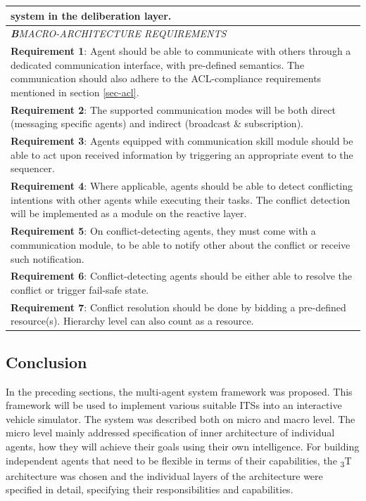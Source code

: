\documentclass[main.tex]{subfiles}
\begin{document}
\begin{table}[htbp]
\begin{tabular}{>{\footnotesize}p{}}
system in the deliberation layer.
\\ \midrule
\emph{\textbf{B}\quad MACRO-ARCHITECTURE REQUIREMENTS} \\ \midrule
\textbf{Requirement 1}: Agent should be able to communicate with others through a dedicated communication 
interface, with pre-defined semantics. The communication should also adhere to the ACL-compliance requirements 
mentioned in section \ref{sec-acl}.
\\ \midrule
\textbf{Requirement 2}: The supported communication modes will be both direct (messaging specific agents) and indirect  
(broadcast \& subscription). 
\\ \midrule
\textbf{Requirement 3}: Agents equipped with communication skill module should be able to act upon received information
by triggering an appropriate event to the sequencer. 
\\ \midrule
\textbf{Requirement 4}: Where applicable, agents should be able to detect conflicting intentions with other agents
while executing their tasks. The conflict detection will be implemented as a module on the reactive layer.
\\ \midrule
\textbf{Requirement 5}: On conflict-detecting agents, they must come with a communication module, to be able to 
notify other about the conflict or receive such notification. 
\\ \midrule
\textbf{Requirement 6}: Conflict-detecting agents should be either able to resolve the conflict or trigger fail-safe 
state. 
\\ \midrule
\textbf{Requirement 7}: Conflict resolution should be done by bidding a pre-defined resource(s). Hierarchy level can 
also count as a resource.
\\ \bottomrule
    \end{tabular}
    \label{sys-requirements}
\end{table}
\clearpage

\subsection{Conclusion}

In the preceding sections, the multi-agent system framework was proposed. This framework will be used to implement various 
suitable ITSs into an interactive vehicle simulator. The system was described both on micro and macro level. The micro level 
mainly addressed specification of inner architecture of individual agents, how they will achieve their goals using their 
own intelligence. For building independent agents that need to be flexible in terms of their capabilities, the \textsubscript{3}T
architecture was chosen and the individual layers of the architecture were specified in detail, specifying their responsibilities
and capabilities. 
\end{document}

